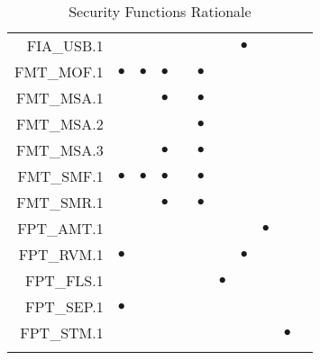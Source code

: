 \documentclass[12pt,english]{scrbook}
\newcommand{\oh}{$\bullet$}
\begin{document}
\begin{longtable}{r|R|R|R|R|R|R|R|R|R|R}
FIA\_USB.1          &            &                &               &          &               &                        &  \oh               &                 &                    \\   
FMT\_MOF.1          & \oh        &  \oh           &  \oh          &          & \oh           &                        &                    &                 &                    \\   
FMT\_MSA.1          &            &                &  \oh          &          & \oh           &                        &                    &                 &                    \\   
FMT\_MSA.2          &            &                &               &          & \oh           &                        &                    &                 &                    \\   
FMT\_MSA.3          &            &                &  \oh          &          & \oh           &                        &                    &                 &                    \\   
FMT\_SMF.1          & \oh        &  \oh           &  \oh          &          & \oh           &                        &                    &                 &                    \\   
FMT\_SMR.1          &            &                &  \oh          &          & \oh           &                        &                    &                 &                    \\   
FPT\_AMT.1          &            &                &               &          &               &                        &                    &    \oh          &                    \\   
FPT\_RVM.1          & \oh        &                &               &          &               &                        &  \oh               &                 &                    \\   
FPT\_FLS.1          &            &                &               &          &               &     \oh                &                    &                 &                    \\   
FPT\_SEP.1          &  \oh       &                &               &          &               &                        &                    &                 &                    \\ 
FPT\_STM.1          &            &                &               &          &               &                        &                    &                 &   \oh              \\       
    \bottomrule
    \caption{Security Functions Rationale} 

\end{longtable}
\end{document}
